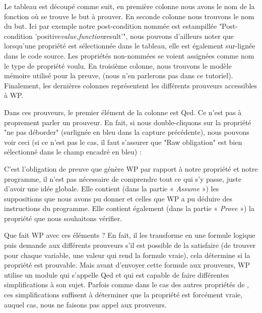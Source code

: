 

Le tableau est découpé comme suit, en première colonne nous avons le nom de la
fonction où se trouve le but à prouver. En seconde colonne nous trouvons le nom
du but. Ici par exemple notre post-condition nommée est estampillée 
"Post-condition 'positive\textit{value,function}result'", nous pouvons d'ailleurs noter
que lorsqu'une propriété est sélectionnée dans le tableau, elle est également 
sur-lignée dans le code source. Les propriétés non-nommées se voient assignées
comme nom le type de propriété voulu. En troisième colonne, nous trouvons le 
modèle mémoire utilisé pour la preuve, (nous n'en parlerons pas dans ce 
tutoriel). Finalement, les dernières colonnes représentent les différents 
prouveurs accessibles à WP.



Dans ces prouveurs, le premier élément de la colonne est Qed. Ce n'est pas
à proprement parler un prouveur. En fait, si nous double-cliquons sur la 
propriété "ne pas déborder" (surlignée en bleu dans la capture précédente), 
nous pouvons voir ceci (si ce n'est pas le cas, il faut s'assurer que
"Raw obligation" est bien sélectionné dans le champ encadré en bleu) :





C'est l'obligation de preuve que génère WP par rapport à notre propriété et 
notre programme, il n'est pas nécessaire de comprendre tout ce qui s'y passe, 
juste d'avoir une idée globale. Elle contient (dans la partie « \textit{Assume} ») les 
suppositions que nous avons pu donner et celles que WP a pu déduire des 
instructions du programme. Elle contient également (dans la partie « \textit{Prove} ») 
la propriété que nous souhaitons vérifier.



Que fait WP avec ces éléments ? En fait, il les transforme en une formule 
logique puis demande aux différents prouveurs s'il est possible de la 
satisfaire (de trouver pour chaque variable, une valeur qui rend la formule 
vraie), cela détermine si la propriété est prouvable. Mais avant d'envoyer 
cette formule aux prouveurs, WP utilise un module qui s'appelle Qed et qui est
capable de faire différentes simplifications à son sujet. Parfois comme dans 
le cas des autres propriétés de , ces simplifications suffisent à 
déterminer que la propriété est forcément vraie, auquel cas, nous ne faisons
pas appel aux prouveurs.



